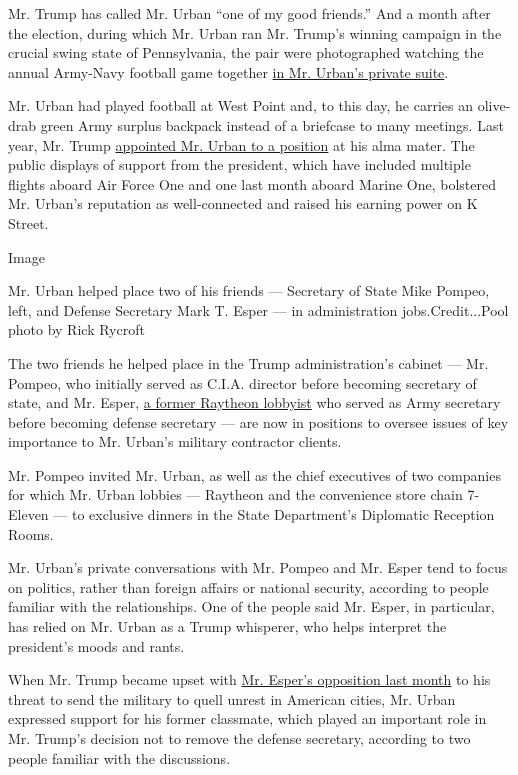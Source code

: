 Mr. Trump has called Mr. Urban ``one of my good friends.'' And a month
after the election, during which Mr. Urban ran Mr. Trump's winning
campaign in the crucial swing state of Pennsylvania, the pair were
photographed watching the annual Army-Navy football game together
\href{https://www.wptv.com/news/national/trump-cheered-by-fans-at-annual-army-navy-game}{in
Mr. Urban's private suite}.

Mr. Urban had played football at West Point and, to this day, he carries
an olive-drab green Army surplus backpack instead of a briefcase to many
meetings. Last year, Mr. Trump
\href{https://www.whitehouse.gov/presidential-actions/president-donald-j-trump-announces-intent-nominate-appoint-individuals-key-administration-posts-15/}{appointed
Mr. Urban to a position} at his alma mater. The public displays of
support from the president, which have included multiple flights aboard
Air Force One and one last month aboard Marine One, bolstered Mr.
Urban's reputation as well-connected and raised his earning power on K
Street.

Image

Mr. Urban helped place two of his friends --- Secretary of State Mike
Pompeo, left, and Defense Secretary Mark T. Esper --- in administration
jobs.Credit...Pool photo by Rick Rycroft

The two friends he helped place in the Trump administration's cabinet
--- Mr. Pompeo, who initially served as C.I.A. director before becoming
secretary of state, and Mr. Esper,
\href{https://www.nytimes.com/2019/06/18/us/politics/mark-esper-acting-defense-secretary.html}{a
former Raytheon lobbyist} who served as Army secretary before becoming
defense secretary --- are now in positions to oversee issues of key
importance to Mr. Urban's military contractor clients.

Mr. Pompeo invited Mr. Urban, as well as the chief executives of two
companies for which Mr. Urban lobbies --- Raytheon and the convenience
store chain 7-Eleven --- to exclusive dinners in the State Department's
Diplomatic Reception Rooms.

Mr. Urban's private conversations with Mr. Pompeo and Mr. Esper tend to
focus on politics, rather than foreign affairs or national security,
according to people familiar with the relationships. One of the people
said Mr. Esper, in particular, has relied on Mr. Urban as a Trump
whisperer, who helps interpret the president's moods and rants.

When Mr. Trump became upset with
\href{https://www.nytimes.com/2020/06/03/us/politics/esper-milley-trump-protest.html}{Mr.
Esper's opposition last month} to his threat to send the military to
quell unrest in American cities, Mr. Urban expressed support for his
former classmate, which played an important role in Mr. Trump's decision
not to remove the defense secretary, according to two people familiar
with the discussions.

